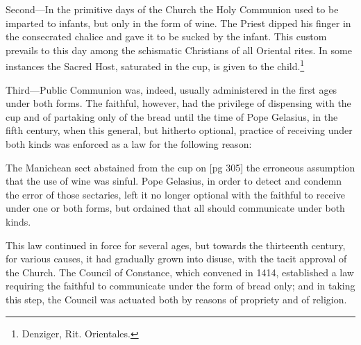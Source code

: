 Second—In the primitive days of the Church
the Holy Communion used to be imparted to infants,
but only in the form of wine. The Priest
dipped his finger in the consecrated chalice and
gave it to be sucked by the infant. This custom
prevails to this day among the schismatic Christians
of all Oriental rites. In some instances the
Sacred Host, saturated in the cup, is given to the
child.\footnote{Denziger, Rit. Orientales.}

Third—Public Communion was, indeed, usually
administered in the first ages under both forms.
The faithful, however, had the privilege of dispensing
with the cup and of partaking only of the
bread until the time of Pope Gelasius, in the fifth
century, when this general, but hitherto optional,
practice of receiving under both kinds was enforced
as a law for the following reason:

The Manichean sect abstained from the cup on
[pg 305]
the erroneous assumption that the use of wine was
sinful. Pope Gelasius, in order to detect and condemn
the error of those sectaries, left it no longer
optional with the faithful to receive under one or
both forms, but ordained that all should communicate
under both kinds.

This law continued in force for several ages, but
towards the thirteenth century, for various causes,
it had gradually grown into disuse, with the tacit
approval of the Church. The Council of Constance,
which convened in 1414, established a law
requiring the faithful to communicate under the
form of bread only; and in taking this step, the
Council was actuated both by reasons of propriety
and of religion.


